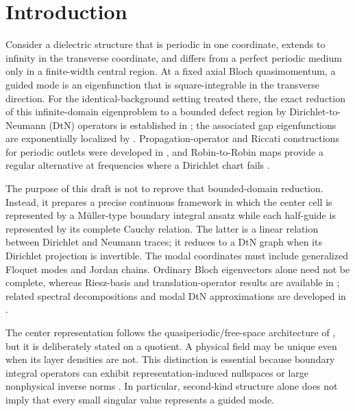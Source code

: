 \section{Introduction}

Consider a dielectric structure that is periodic in one coordinate, extends
to infinity in the transverse coordinate, and differs from a perfect periodic
medium only in a finite-width central region.  At a fixed axial Bloch
quasimomentum, a guided mode is an eigenfunction that is square-integrable in
the transverse direction.  For the identical-background setting treated
there, the exact reduction of this infinite-domain eigenproblem to a bounded
defect region by Dirichlet-to-Neumann (DtN) operators is established in
\cite[Theorem~4.5]{Fliss2013}; the associated gap
eigenfunctions are exponentially localized by
\cite[Theorem~3.5]{Fliss2013}.  Propagation-operator and Riccati constructions
for periodic outlets were developed in \cite{JolyLiFliss2006,Coatleven2012},
and Robin-to-Robin maps provide a regular alternative at frequencies where a
Dirichlet chart fails \cite{FlissKlindworthSchmidt2015}.

The purpose of this draft is not to reprove that bounded-domain reduction.
Instead, it prepares a precise continuous framework in which the center cell is
represented by a M\"uller-type boundary integral ansatz while each half-guide is
represented by its complete Cauchy relation.  The latter is a linear relation
between Dirichlet and Neumann traces; it reduces to a DtN graph when its
Dirichlet projection is invertible.  The modal coordinates must include
generalized Floquet modes and Jordan chains.  Ordinary Bloch eigenvectors alone
need not be complete, whereas Riesz-basis and translation-operator results are
available in \cite[Theorem~2.2]{HohageSoussi2013}; related spectral
decompositions and modal DtN approximations are developed in
\cite{Zhang2021,Zhang2023}.

The center representation follows the quasiperiodic/free-space architecture
of \cite[Theorem~4 and Appendix~A]{BarnettGreengard2010}, but it is deliberately
stated on a quotient.  A physical field may be unique even when its layer
densities are not.  This distinction is essential because boundary integral
operators can exhibit representation-induced nullspaces or large nonphysical
inverse norms \cite{HiptmairMoiolaSpence2022}.  In particular, second-kind
structure alone does not imply that every small singular value represents a
guided mode.

